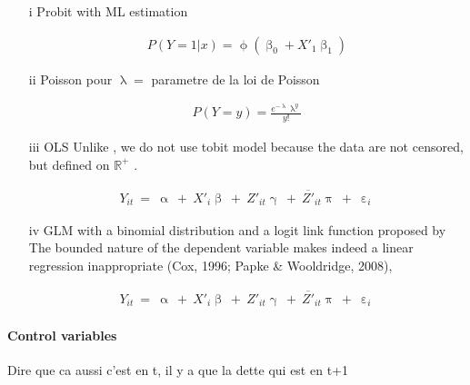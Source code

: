 \documentclass[a4paper, 11pt, onecolumn]{article}
\begin{document}
\begin{enumerate}%
\item[i] Probit with ML estimation 

\begin{equation}\label{eq:probit}
\begin{split}
P(Y=1|x)=\upphi(\upbeta_{0}+X'_{1}\upbeta_{1})
\end{split}
\end{equation}


\item[ii] Poisson pour $\uplambda =$ parametre de la loi de Poisson 

\begin{equation}\label{eq:poisson}
\begin{split}
P(Y=y)=\frac{e^{-\uplambda}\uplambda^{y}}{y!}
\end{split}
\end{equation}


\item[iii] OLS 
Unlike \cite{Brown2014}, we do not use tobit model because the data are not censored, but defined on $\mathbb{R}^{+}$ \citep{Maddala1991}.

\begin{equation}\label{eq:ols}
\begin{split}
Y_{it}~=~\upalpha~+~X'_i\upbeta~+~Z'_{it}\upgamma~+~\overline{Z'}_{it}\uppi~+~\upepsilon_i
\end{split}
\end{equation}



\item[iv] GLM with a binomial distribution and a logit link function proposed by \cite{Papke1996}
The bounded nature of the dependent variable makes indeed a linear regression inappropriate (Cox, 1996; Papke \& Wooldridge, 2008),


\begin{equation}\label{eq:glm}
\begin{split}
Y_{it}~=~\upalpha~+~X'_i\upbeta~+~Z'_{it}\upgamma~+~\overline{Z'}_{it}\uppi~+~\upepsilon_i
\end{split}
\end{equation}



\end{enumerate}



\paragraph{Control variables}
Dire que ca aussi c'est en t, il y a que la dette qui est en t+1
\end{document}
